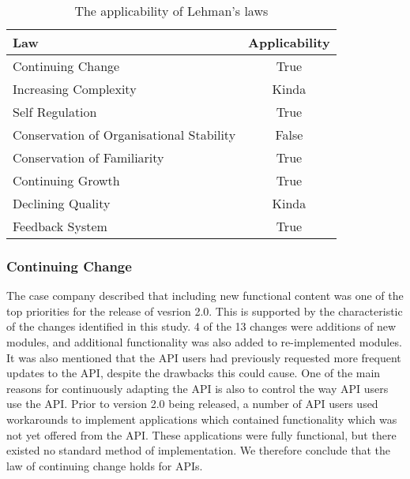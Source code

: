 \documentclass{sig-alternate}
\begin{document}
\begin{table}
       \centering
       \begin{tabular}[ht]{|l|c|}
              \hline

              \textbf{Law}                              & \textbf{Applicability}    \\ \hline
              Continuing Change                         & True                      \\ \hline
              Increasing Complexity                     & Kinda                     \\ \hline
              Self Regulation                           & True                      \\ \hline
              Conservation of Organisational Stability  & False                     \\ \hline
              Conservation of Familiarity               & True                      \\ \hline
              Continuing Growth                         & True                      \\ \hline
              Declining Quality                         & Kinda                     \\ \hline
              Feedback System                           & True                      \\ \hline

       \end{tabular}
       \caption{The applicability of Lehman's laws}
       \label{table:lehman}
\end{table}



\subsubsection{Continuing Change} %
The case company described that including new functional content was one of the top priorities for the release of vesrion 2.0. This is supported by the characteristic of the changes identified in this study. 4 of the 13 changes were additions of new modules, and additional functionality was also added to re-implemented modules. It was also mentioned that the API users had previously requested more frequent updates to the API, despite the drawbacks this could cause. One of the main reasons for continuously adapting the API is also to control the way API users use the API. Prior to version 2.0 being released, a number of API users used workarounds to implement applications which contained functionality which was not yet offered from the API. These applications were fully functional, but there existed no standard method of implementation. We therefore conclude that the law of continuing change holds for APIs. 
\end{document}
